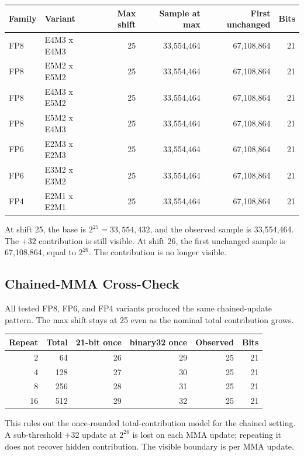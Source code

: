 \documentclass[11pt]{article}
\begin{document}
\begin{tabularx}{\linewidth}{l l R R R R}
\toprule
Family & Variant & Max shift & Sample at max & First unchanged & Bits \\
\midrule
FP8 & E4M3 x E4M3 & 25 & 33,554,464 & 67,108,864 & 21 \\
FP8 & E5M2 x E5M2 & 25 & 33,554,464 & 67,108,864 & 21 \\
FP8 & E4M3 x E5M2 & 25 & 33,554,464 & 67,108,864 & 21 \\
FP8 & E5M2 x E4M3 & 25 & 33,554,464 & 67,108,864 & 21 \\
FP6 & E2M3 x E2M3 & 25 & 33,554,464 & 67,108,864 & 21 \\
FP6 & E3M2 x E3M2 & 25 & 33,554,464 & 67,108,864 & 21 \\
FP4 & E2M1 x E2M1 & 25 & 33,554,464 & 67,108,864 & 21 \\
\bottomrule
\end{tabularx}

At shift 25, the base is \(2^{25}=33{,}554{,}432\), and the observed sample is
33,554,464. The \(+32\) contribution is still visible. At shift 26, the first
unchanged sample is 67,108,864, equal to \(2^{26}\). The contribution is no
longer visible.

\subsection{Chained-MMA Cross-Check}

All tested FP8, FP6, and FP4 variants produced the same chained-update pattern.
The max shift stays at 25 even as the nominal total contribution grows.

{\footnotesize
\begin{tabularx}{\linewidth}{R R R R R R}
\toprule
Repeat & Total & 21-bit once & binary32 once & Observed & Bits \\
 & 64 & 26 & 29 & 25 & 21 \\
4 & 128 & 27 & 30 & 25 & 21 \\
8 & 256 & 28 & 31 & 25 & 21 \\
16 & 512 & 29 & 32 & 25 & 21 \\
\bottomrule
\end{tabularx}
}

This rules out the once-rounded total-contribution model for the chained
setting. A sub-threshold \(+32\) update at \(2^{26}\) is lost on each MMA
update; repeating it does not recover hidden contribution. The visible boundary
is per MMA update.
\end{document}
